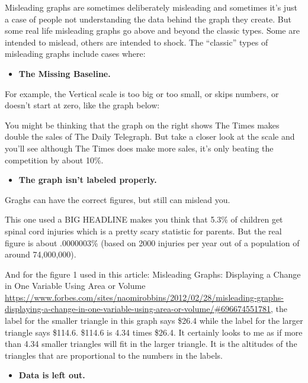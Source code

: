 \documentclass[]{book}
\providecommand{\tightlist}{%
  \setlength{\itemsep}{0pt}\setlength{\parskip}{0pt}}
\theoremstyle{definition}
\theoremstyle{definition}
\theoremstyle{definition}
\theoremstyle{remark}
\begin{document}
Misleading graphs are sometimes deliberately misleading and sometimes
it's just a case of people not understanding the data behind the graph
they create. But some real life misleading graphs go above and beyond
the classic types. Some are intended to mislead, others are intended to
shock. The ``classic'' types of misleading graphs include cases where:

\begin{itemize}
\tightlist
\item
  \textbf{The Missing Baseline.}
\end{itemize}

For example, the Vertical scale is too big or too small, or skips
numbers, or doesn't start at zero, like the graph below:

You might be thinking that the graph on the right shows The Times makes
double the sales of The Daily Telegraph. But take a closer look at the
scale and you'll see although The Times does make more sales, it's only
beating the competition by about 10\%.

\begin{itemize}
\tightlist
\item
  \textbf{The graph isn't labeled properly.}
\end{itemize}

Graghs can have the correct figures, but still can mislead you.

This one used a BIG HEADLINE makes you think that 5.3\% of children get
spinal cord injuries which is a pretty scary statistic for parents. But
the real figure is about .0000003\% (based on 2000 injuries per year out
of a population of around 74,000,000).

And for the figure 1 used in this article: Misleading Graphs: Displaying
a Change in One Variable Using Area or Volume
\url{https://www.forbes.com/sites/naomirobbins/2012/02/28/misleading-graphs-displaying-a-change-in-one-variable-using-area-or-volume/\#696674551781},
the label for the smaller triangle in this graph says \$26.4 while the
label for the larger triangle says \$114.6. \$114.6 is 4.34 times
\$26.4. It certainly looks to me as if more than 4.34 smaller triangles
will fit in the larger triangle. It is the altitudes of the triangles
that are proportional to the numbers in the labels.

\begin{itemize}
\tightlist
\item
  \textbf{Data is left out.}
\end{itemize}
\end{document}
